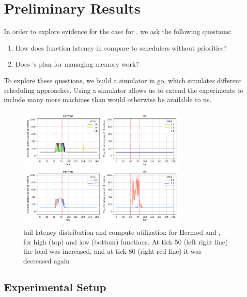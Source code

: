 \section{Preliminary Results}



In order to explore evidence for the case for \sys{}, we ask the following
questions: 
\begin{enumerate}
    \item How does function latency in \sys{} compare to schedulers without
    priorities?
    \item Does \sys{}'s plan for managing memory work?
\end{enumerate}


To explore these questions, we build a simulator in go\cite{golang}, which
simulates different scheduling approaches. Using a simulator allows us to extend
the experiments to include many more machines than would otherwise be available
to us.

\begin{figure}[t!]
    \centering
      \includegraphics[width=8.5cm]{img/hermod_xx_latencies.png}
      \caption{ tail latency distribution and compute utilization for Hermod and
      \sys{}, for high (top) and low (bottom) \priceclass{} functions. At tick
      50 (left right line) the load was increased, and at tick 80 (right red
      line) it was decreased again }
    \label{fig:hermod-xx-edf}
\end{figure}


\subsection{Experimental Setup}

